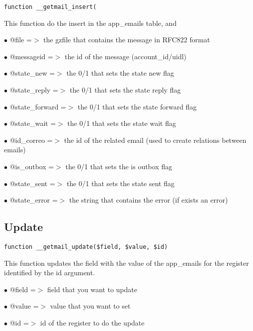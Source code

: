 \documentclass[a4paper]{book}
\begin{document}
\begin{lstlisting}
function __getmail_insert(
\end{lstlisting}

This function do the insert in the app\_emails table, and

\begin{compactitem}
\item[\color{myblue}$\bullet$] @file          =$>$ the gzfile that contains the message in RFC822 format
\item[\color{myblue}$\bullet$] @messageid     =$>$ the id of the message (account\_id/uidl)
\item[\color{myblue}$\bullet$] @state\_new     =$>$ the 0/1 that sets the state new flag
\item[\color{myblue}$\bullet$] @state\_reply   =$>$ the 0/1 that sets the state reply flag
\item[\color{myblue}$\bullet$] @state\_forward =$>$ the 0/1 that sets the state forward flag
\item[\color{myblue}$\bullet$] @state\_wait    =$>$ the 0/1 that sets the state wait flag
\item[\color{myblue}$\bullet$] @id\_correo     =$>$ the id of the related email (used to create relations between emails)
\item[\color{myblue}$\bullet$] @is\_outbox     =$>$ the 0/1 that sets the is outbox flag
\item[\color{myblue}$\bullet$] @state\_sent    =$>$ the 0/1 that sets the state sent flag
\item[\color{myblue}$\bullet$] @state\_error   =$>$ the string that contains the error (if exists an error)
\end{compactitem}

\hypertarget{toc550}{}
\subsection{Update}

\begin{lstlisting}
function __getmail_update($field, $value, $id)
\end{lstlisting}

This function updates the field with the value of the app\_emails for the
register identified by the id argument.

\begin{compactitem}
\item[\color{myblue}$\bullet$] @field =$>$ field that you want to update
\item[\color{myblue}$\bullet$] @value =$>$ value that you want to set
\item[\color{myblue}$\bullet$] @id    =$>$ id of the register to do the update
\end{compactitem}
\end{document}

